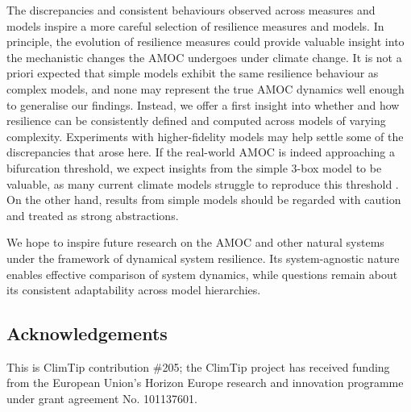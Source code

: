 \documentclass[12pt, a4paper]{article}
\begin{document}
The discrepancies and consistent behaviours observed across measures and models inspire a more careful selection of resilience measures and models. In principle, the evolution of resilience measures could provide valuable insight into the mechanistic changes the AMOC undergoes under climate change. It is not a priori expected that simple models exhibit the same resilience behaviour as complex models, and none may represent the true AMOC dynamics well enough to generalise our findings. Instead, we offer a first insight into whether and how resilience can be consistently defined and computed across models of varying complexity. Experiments with higher-fidelity models may help settle some of the discrepancies that arose here. If the real-world AMOC is indeed approaching a bifurcation threshold, we expect insights from the simple 3-box model to be valuable, as many current climate models struggle to reproduce this threshold \citep{Valdes2011BuiltStability, Liu2017OverlookedPossibilityCollapsed, McCarthy2023TrustAMOCProjections}. On the other hand, results from simple models should be regarded with caution and treated as strong abstractions.

We hope to inspire future research on the AMOC and other natural systems under the framework of dynamical system resilience. Its system-agnostic nature enables effective comparison of system dynamics, while questions remain about its consistent adaptability across model hierarchies.

\subsection*{Acknowledgements}
This is ClimTip contribution \#205; the ClimTip project has received funding from the European Union's Horizon Europe research and innovation programme under grant agreement No. 101137601.


\end{document}
